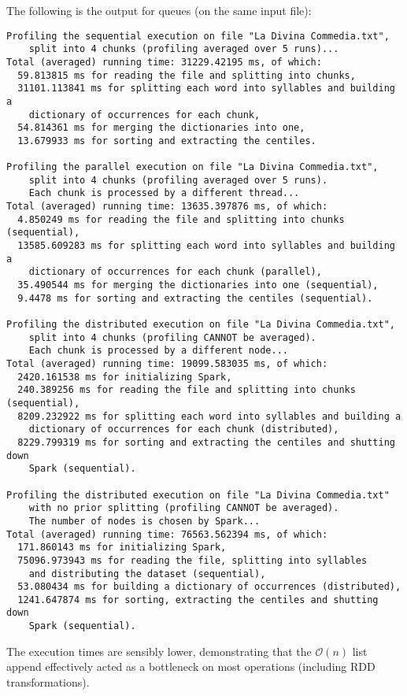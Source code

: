The following is the output for queues (on the same input file):
\begin{verbatim}
Profiling the sequential execution on file "La Divina Commedia.txt",
    split into 4 chunks (profiling averaged over 5 runs)...
Total (averaged) running time: 31229.42195 ms, of which:
  59.813815 ms for reading the file and splitting into chunks,
  31101.113841 ms for splitting each word into syllables and building a
    dictionary of occurrences for each chunk,
  54.814361 ms for merging the dictionaries into one,
  13.679933 ms for sorting and extracting the centiles.

Profiling the parallel execution on file "La Divina Commedia.txt",
    split into 4 chunks (profiling averaged over 5 runs).
    Each chunk is processed by a different thread...
Total (averaged) running time: 13635.397876 ms, of which:
  4.850249 ms for reading the file and splitting into chunks (sequential),
  13585.609283 ms for splitting each word into syllables and building a
    dictionary of occurrences for each chunk (parallel),
  35.490544 ms for merging the dictionaries into one (sequential),
  9.4478 ms for sorting and extracting the centiles (sequential).

Profiling the distributed execution on file "La Divina Commedia.txt",
    split into 4 chunks (profiling CANNOT be averaged).
    Each chunk is processed by a different node...
Total (averaged) running time: 19099.583035 ms, of which:
  2420.161538 ms for initializing Spark,
  240.389256 ms for reading the file and splitting into chunks (sequential),
  8209.232922 ms for splitting each word into syllables and building a
    dictionary of occurrences for each chunk (distributed),
  8229.799319 ms for sorting and extracting the centiles and shutting down
    Spark (sequential).

Profiling the distributed execution on file "La Divina Commedia.txt"
    with no prior splitting (profiling CANNOT be averaged).
    The number of nodes is chosen by Spark...
Total (averaged) running time: 76563.562394 ms, of which:
  171.860143 ms for initializing Spark,
  75096.973943 ms for reading the file, splitting into syllables
    and distributing the dataset (sequential),
  53.080434 ms for building a dictionary of occurrences (distributed),
  1241.647874 ms for sorting, extracting the centiles and shutting down
    Spark (sequential).
\end{verbatim}

The execution times are sensibly lower, demonstrating that the $\mathcal{O}(n)$ list append effectively acted as a bottleneck on most operations (including RDD transformations).

